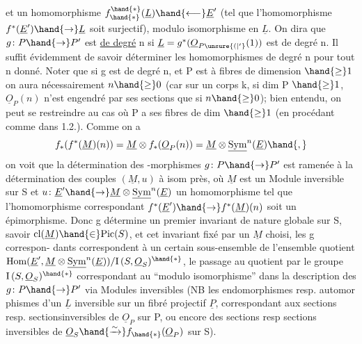 
et  un homomorphisme  $f^{\hand{*}}_{\hand{*}}(\underline{L}) \hand{\longleftarrow} \underline{E}'$  (tel que l'homomorphisme 
$f^{*}(\underline{E}') \hand{\to} \underline{L}$  soit surjectif), modulo  isomorphisme en $\underline{L}$.  On dira que
$g\colon P \hand{\to} P'$  est \uline{de degré} n si $\underline{L} = g^{*}(\underline{O}_{P\unsure{(|'}}(1))$  est de degré n. Il suffit
évidemment de savoir déterminer les homomorphismes de degré n pour tout n
donné.  Noter que si g est de degré n, et P est à fibres de dimension $\hand{\geq} 1$ on aura nécessairement $n \hand{\geq} 0$
(car  sur un corps k,  si dim P $\hand{\geq} 1$, $\underline{O}_P(n)$ n'est engendré par ses
sections que si $n \hand{\geq} 0$); bien entendu, on peut  se restreindre au cas
où P a ses fibres de dim $\hand{\geq} 1$ (en procédant comme dans 1.2.).  Comme on a
\[ f_{*}(f^{*}(\underline{M})(n)) = \underline{M} \otimes f_{*}(\underline{O}_P(n)) = \underline{M} \otimes \underline{\mathrm{Sym}}^{n}(\underline{E}) \hand{,} \]
on voit que la détermination des -morphismes  $g\colon P \hand{\to} P'$  est ramenée
à la détermination des couples $(\underline{M},u)$ à isom près, où $\underline{M}$  est un Module
inversible sur S et  $u\colon \underline{E}' \hand{\to} \underline{M}\otimes\underline{\mathrm{Sym}}^{n}(\underline{E})$  un homomorphisme  tel que
l'homomorphisme correspondant  $f^{*}(\underline{E}') \hand{\to} f^{*}(\underline{M})(n)$  soit un épimorphisme.
Donc  g détermine un premier invariant de nature globale sur S, savoir
$\mathrm{cl}(\underline{M}) \hand{\in} \mathrm{Pic}(S)$, et cet invariant fixé par un $\underline{M}$ choisi,  les g correspon-%
dants correspondent à un certain sous-ensemble de l'ensemble quotient
$\mathrm{Hom}(\underline{E}',\underline{M}\otimes\underline{\mathrm{Sym}}^{n}(\underline{E}))/\mathrm{I}\,(S,\underline{O}_S)^{\hand{*}}$,  le passage au quotient par le groupe
$\mathrm{I}\,(S,\underline{O}_S)^{\hand{*}}$ correspondant  au  ``modulo isomorphisme'' dans la description
des $g\colon P \hand{\to} P'$ via Modules inversibles  (NB  les endomorphismes resp. automor
phismes d'un $\underline{L}$ inversible sur un fibré projectif $\underline{P}$, correspondant aux
sections resp. sections\hand{/}inversibles de $\underline{O}_P$ sur P,  ou encore des sections
resp sections inversibles de $\underline{O}_S \hand{\xrightarrow{\sim}} f_{\hand{*}}(\underline{O}_P)$ sur S).

